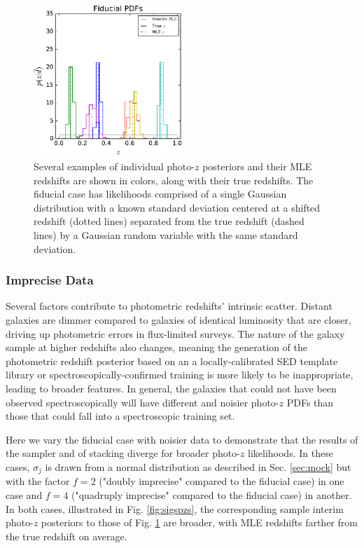 \documentclass[preprint]{aastex}
\begin{document}
\begin{figure}
\includegraphics[width=0.5\textwidth]{figs/null/samplepzs.pdf}
\caption{Several examples of individual photo-$z$ posteriors and their MLE 
redshifts are shown in colors, along with their true redshifts.  The fiducial 
case has likelihoods comprised of a single Gaussian distribution with a known 
standard deviation centered at a shifted redshift (dotted lines) separated from 
the true redshift (dashed lines) by a Gaussian random variable with the same 
standard deviation.}
\label{fig:nullpzs}
\end{figure}

\subsubsection{Imprecise Data}
\label{sec:imprecision}

Several factors contribute to photometric redshifts' intrinsic scatter.  
Distant galaxies are dimmer compared to galaxies of identical luminosity that 
are closer, driving up photometric errors in flux-limited surveys.  The nature 
of the galaxy sample at higher redshifts also changes, meaning the generation 
of the photometric redshift posterior based on an a locally-calibrated SED 
template library or spectroscopically-confirmed training is more likely to be 
inappropriate, leading to broader features.  In general, the galaxies that 
could not have been observed spectroscopically will have different and noisier 
photo-$z$ PDFs than those that could fall into a spectroscopic training set.

Here we vary the fiducial case with noisier data to demonstrate that the 
results of the sampler and of stacking diverge for broader photo-$z$ 
likelihoods.  In these cases, $\sigma_{j}$ is drawn from a normal distribution 
as described in Sec. \ref{sec:mock} but with the factor $f=2$ ("doubly 
imprecise" compared to the fiducial case) in one case and $f=4$ ("quadruply 
imprecise" compared to the fiducial case) in another.  In both cases, 
illustrated in Fig. \ref{fig:sigspzs}, the corresponding sample interim 
photo-$z$ posteriors to those of Fig. \ref{fig:nullpzs} are broader, with MLE 
redshifts farther from the true redshift on average.
\end{document}
